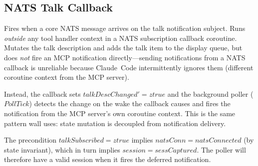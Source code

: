 \documentclass[a4paper,10pt,fleqn]{article}
\begin{document}
\subsection{NATS Talk Callback}

Fires when a core NATS message arrives on the talk notification
subject.  Runs \emph{outside} any tool handler context in a NATS
subscription callback coroutine.  Mutates the talk description and
adds the talk item to the display queue, but does \emph{not} fire
an MCP notification directly---sending notifications from a NATS
callback is unreliable because Claude~Code intermittently ignores
them (different coroutine context from the MCP server).

Instead, the callback sets $talkDescChanged' = ztrue$ and the
background poller ($PollTick$) detects the change on the wake the callback
causes and fires the notification from the MCP server's own coroutine
context.  This is the same pattern wall uses: state mutation is
decoupled from notification delivery.

The precondition $talkSubscribed = ztrue$ implies
$natsConn = natsConnected$ (by state invariant), which in turn implies
$session = sessCaptured$.  The poller will therefore have a valid
session when it fires the deferred notification.
\end{document}
